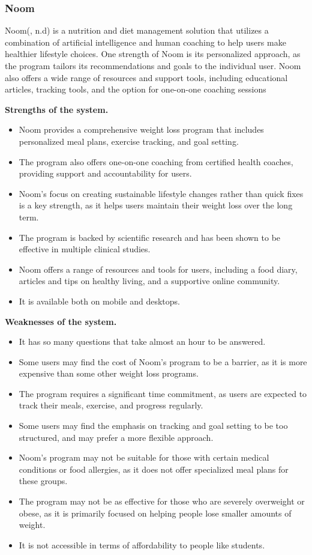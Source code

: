 \documentclass{article}
\begin{document}
\subsubsection{Noom}
Noom(, n.d) is a nutrition and diet management solution that utilizes a combination of artificial intelligence and human coaching to help users make healthier lifestyle choices. One strength of Noom is its personalized approach, as the program tailors its recommendations and goals to the individual user. Noom also offers a wide range of resources and support tools, including educational articles, tracking tools, and the option for one-on-one coaching sessions


\textbf{Strengths of the system.}
\begin{itemize}
\item Noom provides a comprehensive weight loss program that includes personalized meal plans, exercise tracking, and goal setting.
\item The program also offers one-on-one coaching from certified health coaches, providing support and accountability for users.
\item Noom's focus on creating sustainable lifestyle changes rather than quick fixes is a key strength, as it helps users maintain their weight loss over the long term.
\item The program is backed by scientific research and has been shown to be effective in multiple clinical studies.
\item Noom offers a range of resources and tools for users, including a food diary, articles and tips on healthy living, and a supportive online community.
\item It is available both on mobile and desktops.
\end{itemize}

\textbf{Weaknesses of the system.}
\begin{itemize}
\item It has so many questions that take almost an hour to be answered.
\item Some users may find the cost of Noom's program to be a barrier, as it is more expensive than some other weight loss programs.
\item The program requires a significant time commitment, as users are expected to track their meals, exercise, and progress regularly.
\item Some users may find the emphasis on tracking and goal setting to be too structured, and may prefer a more flexible approach.
\item Noom's program may not be suitable for those with certain medical conditions or food allergies, as it does not offer specialized meal plans for these groups.
\item The program may not be as effective for those who are severely overweight or obese, as it is primarily focused on helping people lose smaller amounts of weight.
\item It is not accessible in terms of affordability to people like students.
\end{itemize}
\end{document}
